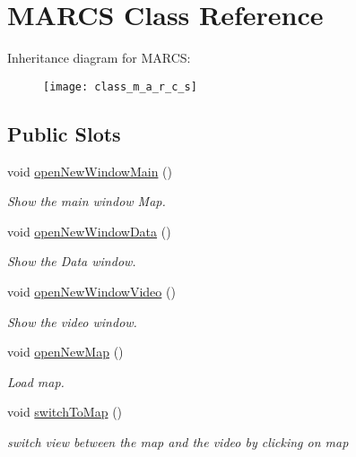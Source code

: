 \hypertarget{class_m_a_r_c_s}{\section{M\-A\-R\-C\-S Class Reference}
\label{class_m_a_r_c_s}
}
Inheritance diagram for M\-A\-R\-C\-S\-:\begin{figure}[H]
\begin{center}
\leavevmode
\texttt{[image: class\_m\_a\_r\_c\_s]}
\end{center}
\end{figure}
\subsection*{Public Slots}
\begin{DoxyCompactItemize}
\item 
void \hyperlink{class_m_a_r_c_s_a7f951c8edf8894681bbb50e3c005872c}{open\-New\-Window\-Main} ()
\begin{DoxyCompactList}\small\item\em Show the main window Map. \end{DoxyCompactList}\item 
void \hyperlink{class_m_a_r_c_s_ace5e9384e1fafb25db7bf3dfe7713af8}{open\-New\-Window\-Data} ()
\begin{DoxyCompactList}\small\item\em Show the Data window. \end{DoxyCompactList}\item 
void \hyperlink{class_m_a_r_c_s_a5d9ee9959e4907688d62ec983a42aa60}{open\-New\-Window\-Video} ()
\begin{DoxyCompactList}\small\item\em Show the video window. \end{DoxyCompactList}\item 
void \hyperlink{class_m_a_r_c_s_a29abe4ed928c488816a419fcef918283}{open\-New\-Map} ()
\begin{DoxyCompactList}\small\item\em Load map. \end{DoxyCompactList}\item 
void \hyperlink{class_m_a_r_c_s_a5dc90a5328281736853cb3e07c5a9a20}{switch\-To\-Map} ()
\begin{DoxyCompactList}\small\item\em switch view between the map and the video by clicking on map \end{DoxyCompactList}\item 

\end{DoxyCompactItemize}
